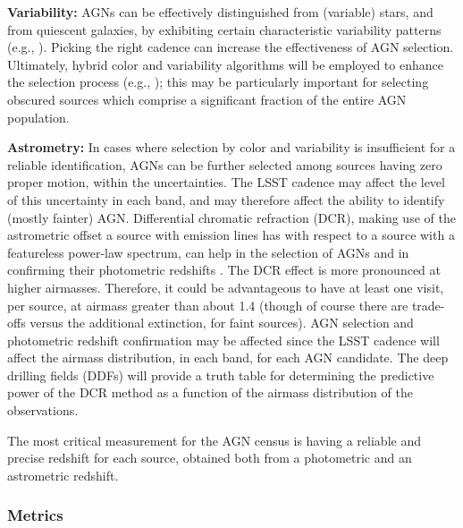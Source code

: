 {\bf Variability:} AGNs can be effectively distinguished from (variable)
stars, and from quiescent galaxies, by exhibiting certain characteristic
variability patterns (e.g., \citealt{ButlerandBloom2011}). Picking the
right cadence can increase the effectiveness of AGN selection. Ultimately,
hybrid color and variability algorithms will be employed to enhance
the selection process (e.g., \citealt{Petersetal2015}); this may be
particularly important for selecting obscured sources which comprise a
significant fraction of the entire AGN population.


{\bf Astrometry:} In cases where selection by color and variability is
insufficient for a reliable identification, AGNs can be further selected
among sources having zero proper motion, within the uncertainties. The
LSST cadence may affect the level of this uncertainty in each band, and
may therefore affect the ability to identify (mostly fainter) AGN.
%
Differential chromatic refraction (DCR), making use of the astrometric offset a
source with emission lines has with respect to a source with a featureless
power-law spectrum, can help in the selection of AGNs and in confirming their
photometric redshifts \citep{KaczmarczikEtal2009}. The DCR effect is more
pronounced at higher airmasses. Therefore, it could be advantageous to have at
least one visit, per source, at airmass greater than about 1.4 (though of course
there are trade-offs versus the additional extinction, for faint sources). AGN
selection and photometric redshift confirmation may be affected since the LSST
cadence will affect the airmass distribution, in each band, for each AGN
candidate.
%
The deep drilling fields (DDFs) will provide a truth table for determining
the predictive power of the DCR method as a function of the airmass
distribution of the observations.

The most critical measurement for the AGN census is having a reliable
and precise redshift for each source, obtained both from a photometric
and an astrometric redshift.



\subsubsection{Metrics}
\label{sec:\secname:metrics}


